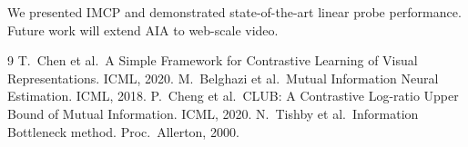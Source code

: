 \documentclass[11pt]{article}
\begin{document}
We presented IMCP and demonstrated state-of-the-art linear probe performance. Future work will extend AIA to web-scale video.

\begin{thebibliography}{9}
T.~Chen et al.\ A Simple Framework for Contrastive Learning of Visual Representations. ICML, 2020.
M.~Belghazi et al.\ Mutual Information Neural Estimation. ICML, 2018.
P.~Cheng et al.\ CLUB: A Contrastive Log-ratio Upper Bound of Mutual Information. ICML, 2020.
N.~Tishby et al.\ Information Bottleneck method. Proc.\ Allerton, 2000.
\end{thebibliography}
\end{document}
